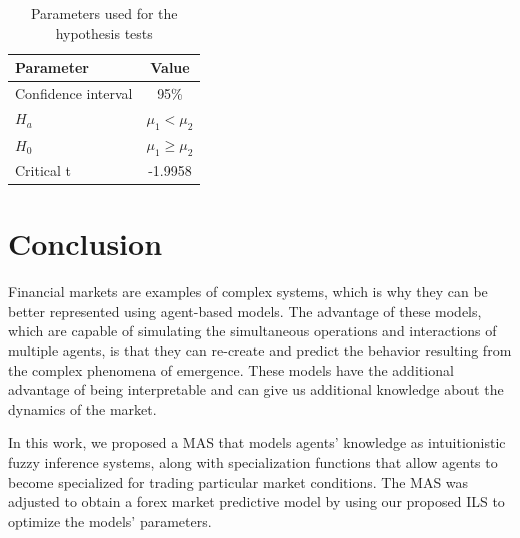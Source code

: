 \documentclass{ieeeaccess}
\begin{document}
\begin{table}[]
  \caption{Parameters used for the hypothesis tests}
  \small
  \centering
  \begin{tabular}{lc}
    \textbf{Parameter} & \textbf{Value} \\
    \hline
    Confidence interval & 95\% \\
    $H_a$ & $\mu_1 < \mu_2$ \\
    $H_0$ & $\mu_1 \geq \mu_2$ \\
    Critical t & -1.9958 \\
  \end{tabular}
  \label{table:parameters-tests}
\end{table}

\section{Conclusion}
\label{section:conclusion}


Financial markets are examples of complex systems, which is why they
can be better represented using agent-based models. The advantage of these models, which are capable of simulating the
simultaneous operations and interactions of multiple agents, is that they can
re-create and predict the behavior resulting from the complex phenomena of
emergence. These models have the additional advantage of being interpretable and
can give us additional knowledge about the dynamics of the market.

In this work, we proposed a MAS that models agents' knowledge as
intuitionistic fuzzy inference systems, along with specialization
functions that allow agents to become specialized for trading
particular market conditions. The MAS was adjusted to obtain a forex
market predictive model by using our proposed ILS to optimize the
models' parameters.
\end{document}
